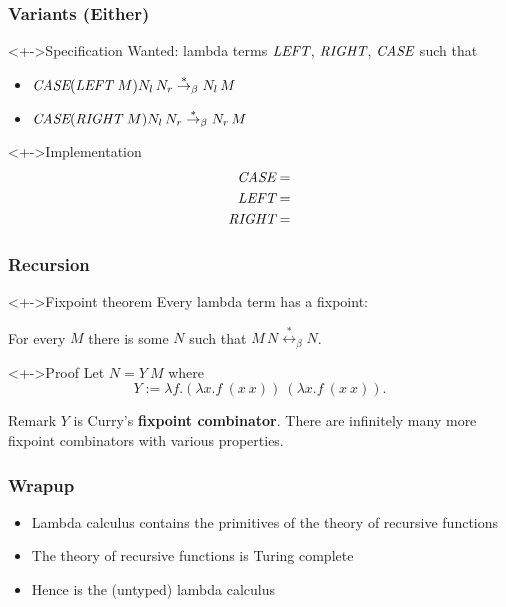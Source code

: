 \documentclass[pdftex,aspectratio=169]{beamer}
\begin{document}
\begin{frame}
  \frametitle{Variants (Either)}
  \begin{exampleblock}<+->{Specification}
    Wanted: lambda terms $\textit{LEFT}$, $\textit{RIGHT}$, $\textit{CASE}$ such that
    \begin{itemize}
    \item $\textit{CASE} (\textit{LEFT}~M) N_l\,N_r \stackrel\ast\rightarrow_\beta N_l\,M$
    \item $\textit{CASE} (\textit{RIGHT}~M) N_l\,N_r \stackrel\ast\rightarrow_\beta N_r\,M$
    \end{itemize}
  \end{exampleblock}
  \begin{alertblock}<+->{Implementation}\VSPBLS
    \begin{align*}
      \textit{CASE} &= \\
      \textit{LEFT} &= \\
      \textit{RIGHT}&=
    \end{align*}
  \end{alertblock}
\end{frame}
\begin{frame}
  \frametitle{Recursion}
  \begin{alertblock}<+->{Fixpoint theorem}
    Every lambda term has a fixpoint:

    For every $M$ there is some $N$ such that
    $
    M\, N \overset{\ast}{\leftrightarrow}_\beta N
    $.
  \end{alertblock}
  \begin{exampleblock}<+->{Proof}
    Let $N = Y~M$ where
    \begin{displaymath}
      Y := \lambda f.(\lambda x.f~(x~x))~(\lambda x.f~(x~x)).
    \end{displaymath}
  \end{exampleblock}
  \begin{block}{Remark}
    $Y$ is Curry's \textbf{fixpoint combinator}. There are infinitely
    many more fixpoint combinators with various properties.
  \end{block}
\end{frame}
\begin{frame}
  \frametitle{Wrapup}
  \begin{itemize}
  \item Lambda calculus contains the primitives of the theory of
    recursive functions
  \item The theory of recursive functions is Turing complete
  \item Hence is the (untyped) lambda calculus
  \end{itemize}
\end{frame}
\end{document}
